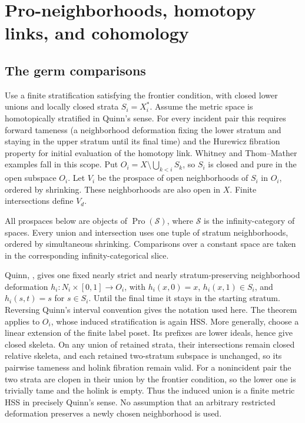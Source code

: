 \documentclass[11pt,a4paper]{article}
\theoremstyle{definition}
\begin{document}
\section{Pro-neighborhoods, homotopy links, and cohomology}\label{c.4.-pro-neighbourhoods-holinks-and-cohomology}

\subsection{The germ comparisons}\label{c4.01-proved-for-finite-metric-hss-the-germ-comparisons}

Use a finite stratification satisfying the frontier condition, with closed lower unions and locally closed strata \(S_i=X_i^*\). Assume the metric space is homotopically stratified in Quinn's sense. For every incident pair this requires forward tameness (a neighborhood deformation fixing the lower stratum and staying in the upper stratum until its final time) and the Hurewicz fibration property for initial evaluation of the homotopy link. Whitney and Thom--Mather examples fall in this scope. Put \(O_i=X\setminus\bigcup_{k<i}S_k\), so \(S_i\) is closed and pure in the open subspace \(O_i\). Let \(V_i\) be the prospace of open neighborhoods of \(S_i\) in \(O_i\), ordered by shrinking. These neighborhoods are also open in \(X\). Finite intersections define \(V_d\).

All prospaces below are objects of $\operatorname{Pro}(\mathcal S)$,
where $\mathcal S$ is the infinity-category of spaces. Every union and
intersection uses one tuple of stratum neighborhoods, ordered by
simultaneous shrinking. Comparisons over a constant space are taken in
the corresponding infinity-categorical slice.

Quinn, \cite[Proposition~3.2, p.~469]{Quinn}, gives one fixed nearly strict and nearly stratum-preserving neighborhood deformation \(h_i:N_i\times[0,1]\to O_i\), with \(h_i(x,0)=x\), \(h_i(x,1)\in S_i\), and \(h_i(s,t)=s\) for \(s\in S_i\). Until the final time it stays in the starting stratum. Reversing Quinn's interval convention gives the notation used here. The theorem applies to \(O_i\), whose induced stratification is again HSS. More generally, choose a linear extension of the finite label poset. Its prefixes are lower ideals, hence give closed skeleta. On any union of retained strata, their intersections remain closed relative skeleta, and each retained two-stratum subspace is unchanged, so its pairwise tameness and holink fibration remain valid. For a nonincident pair the two strata are clopen in their union by the frontier condition, so the lower one is trivially tame and the holink is empty. Thus the induced union is a finite metric HSS in precisely Quinn's sense. No assumption that an arbitrary restricted deformation preserves a newly chosen neighborhood is used.
\end{document}
